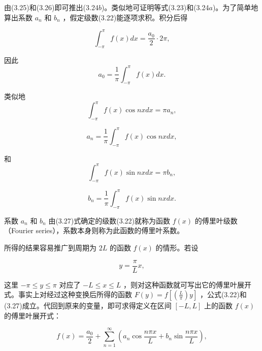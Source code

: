 由(3.25)和(3.26)即可推出(3.24$b$)。类似地可证明等式(3.23)和(3.24$a$)。为了简单地算出系数 $a_{n}$ 和 $b_{n}$ ，假定级数(3.22)能逐项求积。积分后得

\begin{equation*}
\int_ {- \pi} ^ {\pi} f (x) d x = \frac {a _ {0}}{2} \cdot 2 \pi ,
\end{equation*}

因此
\begin{equation*}
a _ {0} = \frac {1}{\pi} \int_ {- \pi} ^ {\pi} f (x) d x.\tag{3.27a}
\end{equation*}

类似地
\begin{equation*}
\int_ {- \pi} ^ {\pi} f (x) \cos n x d x = \pi a _ {n},
\end{equation*}

\begin{equation*}
a _ {n} = \frac {1}{\pi} \int_ {- \pi} ^ {\pi} f (x) \cos n x d x,\tag{3.27b}
\end{equation*}

和
\begin{equation*}
\int_ {- \pi} ^ {\pi} f (x) \sin n x d x = \pi b _ {n},
\end{equation*}

\begin{equation*}
b _ {n} = \frac {1}{\pi} \int_ {- \pi} ^ {\pi} f (x) \sin n x d x.\tag{3.27c}
\end{equation*}

系数 $a_{n}$ 和 $b_{n}$ 由(3.27)式确定的级数(3.22)就称为函数 $f(x)$ 的傅里叶级数（Fourier series），系数本身则称为此函数的傅里叶系数。

所得的结果容易推广到周期为 $2L$ 的函数 $f(x)$ 的情形。若设

\begin{equation*}
y = \frac {\pi}{L} x,
\end{equation*}

这里 $-\pi \leqslant y \leqslant \pi$ 对应了 $-L \leqslant x \leqslant L$ ，则对这种函数就可写出它的傅里叶展开式。事实上对经过这种变换后所得的函数 $F(y) = f\left[\left(\frac{L}{\pi}\right)y\right]$ ，公式(3.22)和(3.27)成立。代回到原来的变量，即可求得定义在区间 $[-L, L]$ 上的函数 $f(x)$ 的傅里叶展开式：

\begin{equation*}
f (x) = \frac {a _ {0}}{2} + \sum_ {n = 1} ^ {\infty} \left(a _ {n} \cos \frac {n \pi x}{L} + b _ {n} \sin \frac {n \pi x}{L}\right),\tag{3.28a}
\end{equation*}

